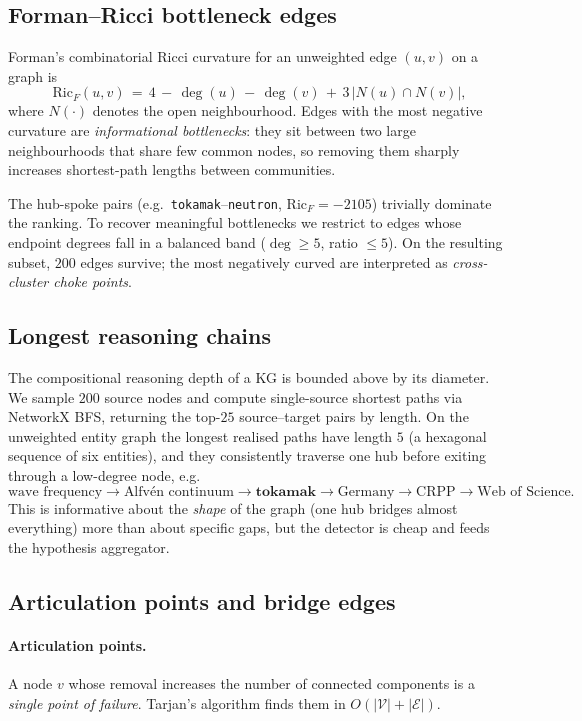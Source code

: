 \documentclass[11pt,a4paper]{article}
\newcommand{\Entset}{\mathcal{E}}
\newcommand{\Vset}{\mathcal{V}}
\newcommand{\code}[1]{\texttt{\small #1}}
\begin{document}
\subsection{Forman--Ricci bottleneck edges}
\label{sec:forman}
Forman's combinatorial Ricci curvature for an unweighted edge $(u,v)$ on a graph is
\begin{equation}\label{eq:forman}
\mathrm{Ric}_F(u,v)\,=\,4 \,-\, \deg(u) \,-\, \deg(v) \,+\, 3\,|N(u)\cap N(v)|,
\end{equation}
where $N(\cdot)$ denotes the open neighbourhood. Edges with the most negative curvature are \emph{informational bottlenecks}: they sit between two large neighbourhoods that share few common nodes, so removing them sharply increases shortest-path lengths between communities.

The hub-spoke pairs (e.g.\ \code{tokamak}--\code{neutron}, $\mathrm{Ric}_F=-2105$) trivially dominate the ranking. To recover meaningful bottlenecks we restrict to edges whose endpoint degrees fall in a balanced band ($\deg\geq 5$, ratio $\leq 5$). On the resulting subset, $200$ edges survive; the most negatively curved are interpreted as \emph{cross-cluster choke points}.

\subsection{Longest reasoning chains}
The compositional reasoning depth of a KG is bounded above by its diameter. We sample $200$ source nodes and compute single-source shortest paths via NetworkX BFS, returning the top-$25$ source--target pairs by length. On the unweighted entity graph the longest realised paths have length $5$ (a hexagonal sequence of six entities), and they consistently traverse one hub before exiting through a low-degree node, e.g.\ 
\[
\text{wave frequency}\!\to\!\text{Alfv\'en continuum}\!\to\!\textbf{tokamak}\!\to\!\text{Germany}\!\to\!\text{CRPP}\!\to\!\text{Web of Science}.
\]
This is informative about the \emph{shape} of the graph (one hub bridges almost everything) more than about specific gaps, but the detector is cheap and feeds the hypothesis aggregator.

\subsection{Articulation points and bridge edges}
\label{sec:cuts}
\paragraph{Articulation points.} A node $v$ whose removal increases the number of connected components is a \emph{single point of failure}. Tarjan's algorithm finds them in $O(|\Vset|+|\Entset|)$.
\end{document}
